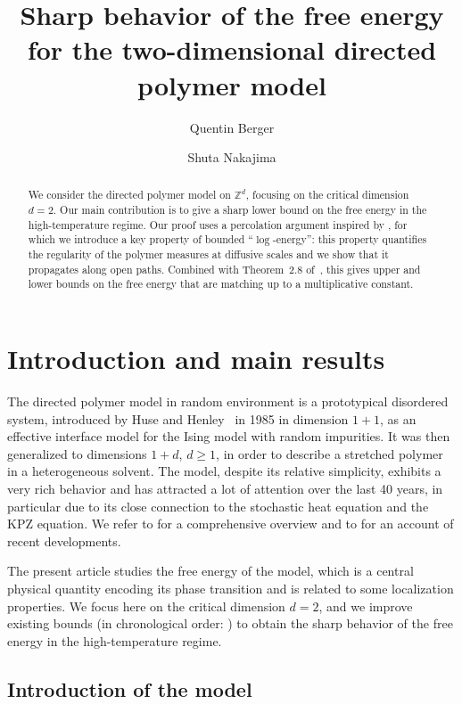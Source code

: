 \documentclass[11pt]{amsart}
\title[Free energy of \(2d\) directed polymers]{Sharp behavior of the free energy for the two-dimensional directed polymer model}
\author{Quentin Berger}
\author{Shuta Nakajima}
\numberwithin{equation}{section}
\theoremstyle{plain}
\theoremstyle{definition}
\theoremstyle{remark}
\begin{document}
\begin{abstract}
  \noindent
  We consider the directed polymer model on \(\mathbb{Z}^d\), focusing on the critical dimension \(d=2\).
  Our main contribution is to give a sharp lower bound on the free energy in the high-temperature regime.
  Our proof uses a percolation argument inspired by \cite{Lac10a}, for which we introduce a key property of bounded ``\(\log\)-energy'': this property quantifies the regularity of the polymer measures at diffusive scales and we show that it propagates along open paths.
  Combined with Theorem~2.8 of~\cite{BCT25}, this gives upper and lower bounds on the free energy that are matching up to a multiplicative constant. 
\end{abstract}


\maketitle




\section{Introduction and main results}


The directed polymer model in random environment is a prototypical disordered system, introduced by Huse and Henley~\cite{HH85} in 1985 in dimension \(1+1\), as an effective interface model for the Ising model with random impurities. 
It was then generalized to dimensions \(1+d\), \(d\geq 1\), in order to describe a stretched polymer in a heterogeneous solvent. 
The model, despite its relative simplicity, exhibits a very rich behavior and has attracted a lot of attention over the last 40 years, in particular due to its close connection to the stochastic heat equation and the KPZ equation.
We refer to \cite{Com17} for a comprehensive overview and to \cite{Zyg24} for an account of recent developments.



The present article studies the free energy of the model, which is a central physical quantity encoding its phase transition and is related to some localization properties. 
We focus here on the critical dimension \(d=2\), and we improve existing bounds (in chronological order: \cite{Lac10a,Nak14,BL17,BCT25}) to obtain the sharp behavior of the free energy in the high-temperature regime.



\subsection{Introduction of the model}
\end{document}
